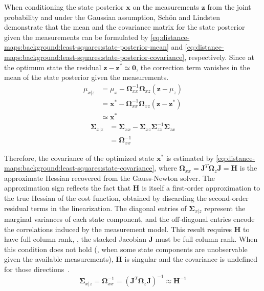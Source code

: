 When conditioning the state posterior $\mathbf{x}$ on the measurements $\mathbf{z}$ from the joint
probability and under the Gaussian assumption,
Sch\"{o}n and Lindsten~\cite{schon-lindsten:tech-report:2011}
demonstrate that the mean and the covariance matrix for the state posterior
given the measurements can be formulated by
\eqref{eq:distance-maps:background:least-squares:state-posterior-mean}
and
\eqref{eq:distance-maps:background:least-squares:state-posterior-covariance},
respectively. Since at the optimum state the residual
$\mathbf{z} - \mathbf{z}^* \simeq \mathbf{0}$, the correction term vanishes
in the mean of the state posterior given the measurements.
\begin{equation}
\label{eq:distance-maps:background:least-squares:state-posterior-mean}
\begin{aligned}
\mu_{x|z} & = \mu_x -
              \mathbf{\Omega}_{xx}^{-1} \mathbf{\Omega}_{xz}
              \left(\mathbf{z} - \mu_z\right)\\
& = \mathbf{x}^* -
    \mathbf{\Omega}_{xx}^{-1} \mathbf{\Omega}_{xz}
    \left(\mathbf{z} - \mathbf{z}^*\right)\\
& \simeq \mathbf{x}^*
\end{aligned}
\end{equation}
\begin{equation}
\label{eq:distance-maps:background:least-squares:state-posterior-covariance}
\begin{aligned}
\mathbf{\Sigma}_{x|z} & =
\mathbf{\Sigma}_{xx} - \mathbf{\Sigma}_{xz} \mathbf{\Sigma}_{zz}^{-1} \mathbf{\Sigma}_{zx}\\
& = \mathbf{\Omega}_{xx}^{-1}
\end{aligned}
\end{equation}

Therefore, the covariance of the optimized state $\mathbf{x}^*$ is estimated by
\eqref{eq:distance-maps:background:least-squares:state-covariance}, where
$\mathbf{\Omega}_{xx} = \mathbf{J}^T \mathbf{\Omega}_z \mathbf{J} = \mathbf{H}$
is the approximate Hessian recovered from the Gauss-Newton solver.
The approximation sign reflects the fact that $\mathbf{H}$ is itself a
first-order approximation to the true Hessian of the cost function,
obtained by discarding the second-order residual terms in the linearization.
The diagonal entries of $\mathbf{\Sigma}_{x|z}$ represent the marginal
variances of each state component, and the off-diagonal entries encode
the correlations induced by the measurement model.
This result requires $\mathbf{H}$ to have full column rank, \ie, the stacked
Jacobian $\mathbf{J}$ must be full column rank.
When this condition does not hold (\eg, when some state components are
unobservable given the available measurements), $\mathbf{H}$ is singular and
the covariance is undefined for those directions~\cite{barfoot:book:2017}.
\begin{equation}
\label{eq:distance-maps:background:least-squares:state-covariance}
\mathbf{\Sigma}_{x|z}
= \mathbf{\Omega}_{xx}^{-1}
= \left(\mathbf{J}^T \mathbf{\Omega}_z \mathbf{J}\right)^{-1}
\approx \mathbf{H}^{-1}
\end{equation}

